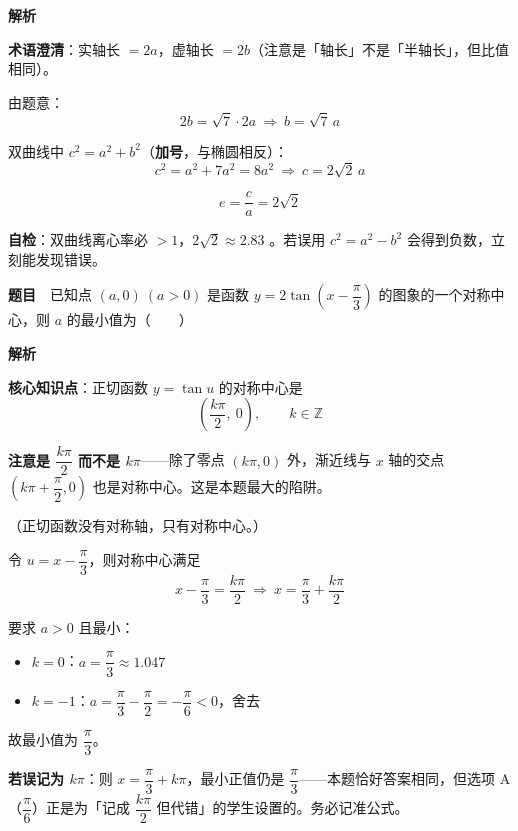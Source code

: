 \textbf{解析}

\textbf{术语澄清}：实轴长 $=2a$，虚轴长 $=2b$（注意是「轴长」不是「半轴长」，但比值相同）。

由题意：
\[2b=\sqrt7\cdot 2a\ \Longrightarrow\ b=\sqrt7\,a\]

双曲线中 $c^2=a^2+b^2$（\textbf{加号}，与椭圆相反）：
\[c^2=a^2+7a^2=8a^2\ \Longrightarrow\ c=2\sqrt2\,a\]

\[e=\frac ca=2\sqrt2\]


\begin{gktip}
\textbf{自检}：双曲线离心率必 $>1$，$2\sqrt2\approx2.83$ 。若误用 $c^2=a^2-b^2$ 会得到负数，立刻能发现错误。
\end{gktip}

\par\medskip


\textbf{题目}　已知点 $(a,0)\ (a>0)$ 是函数 $y=2\tan\left(x-\dfrac\pi3\right)$ 的图象的一个对称中心，则 $a$ 的最小值为（　　）

\textbf{解析}

\textbf{核心知识点}：正切函数 $y=\tan u$ 的对称中心是
\[\left(\frac{k\pi}{2},\ 0\right),\qquad k\in\mathbb{Z}\]

\textbf{注意是 $\dfrac{k\pi}{2}$ 而不是 $k\pi$}——除了零点 $(k\pi,0)$ 外，渐近线与 $x$ 轴的交点 $\left(k\pi+\dfrac\pi2,0\right)$ 也是对称中心。这是本题最大的陷阱。

（正切函数没有对称轴，只有对称中心。）

令 $u=x-\dfrac\pi3$，则对称中心满足
\[x-\frac\pi3=\frac{k\pi}{2}\ \Longrightarrow\ x=\frac\pi3+\frac{k\pi}{2}\]

要求 $a>0$ 且最小：

\begin{itemize}
\item $k=0$：$a=\dfrac\pi3\approx1.047$
\item $k=-1$：$a=\dfrac\pi3-\dfrac\pi2=-\dfrac\pi6<0$，舍去
\end{itemize}

故最小值为 $\dfrac\pi3$。


\begin{gktip}
\textbf{若误记为 $k\pi$}：则 $x=\dfrac\pi3+k\pi$，最小正值仍是 $\dfrac\pi3$——本题恰好答案相同，但选项 A（$\dfrac\pi6$）正是为「记成 $\dfrac{k\pi}{2}$ 但代错」的学生设置的。务必记准公式。
\end{gktip}

